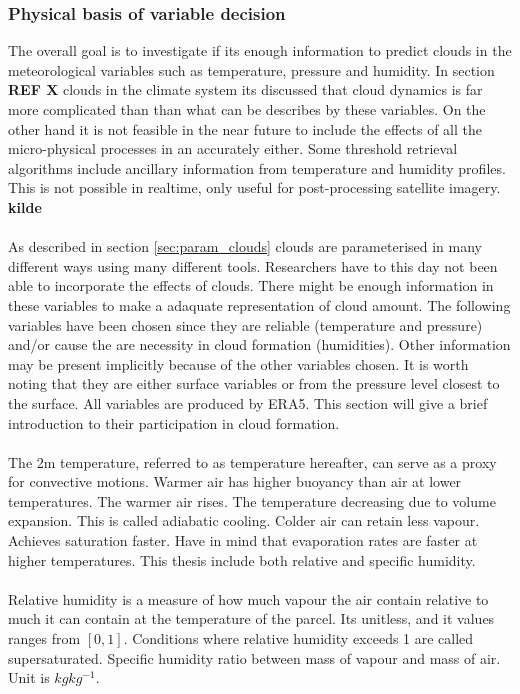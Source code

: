 \subsubsection{Physical basis of variable decision} \label{sec:physical_basis}
The overall goal is to investigate if its enough information to predict clouds in the meteorological variables such as temperature, pressure and humidity. In section \textbf{REF X} clouds in the climate system its discussed that cloud dynamics is far more complicated than than what can be describes by these variables. On the other hand it is not feasible in the near future to include the effects of all the micro-physical processes in an accurately either. Some threshold retrieval algorithms include ancillary information from temperature and humidity profiles. This is not possible in realtime, only useful for post-processing satellite imagery. \textbf{kilde}
\\ \\
As described in section \ref{sec:param_clouds} clouds are parameterised in many different ways using many different tools. Researchers have to this day not been able to incorporate the effects of clouds. There might be enough information in these variables to make a adaquate representation of cloud amount. The following variables have been chosen since they are reliable (temperature and pressure) and/or cause the are necessity in cloud formation (humidities). Other information may be present implicitly because of the other variables chosen. It is worth noting that they are either surface variables or from the pressure level closest to the surface. All variables are produced by ERA5. This section will give a brief introduction to their participation in cloud formation. 
\\ \\
The 2m temperature, referred to as temperature hereafter, can serve as a proxy for convective motions. Warmer air has higher buoyancy than air at lower temperatures. The warmer air rises. The temperature decreasing due to volume expansion. This is called adiabatic cooling. Colder air can retain less vapour. Achieves saturation faster. Have in mind that evaporation rates are faster at higher temperatures. This thesis include both relative and specific humidity. 
\\ \\
Relative humidity is a measure of how much vapour the air contain relative to much it can contain at the temperature of the parcel. Its unitless, and it values ranges from $\left[ 0, 1 \right]$.  Conditions where relative humidity exceeds 1 are called supersaturated. Specific humidity ratio between mass of vapour and mass of air. Unit is $kg kg^{-1}$.
